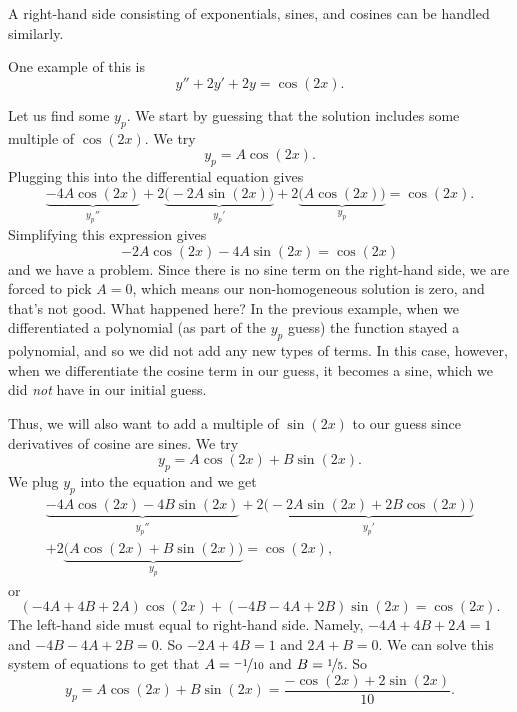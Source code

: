 \medskip

A right-hand side consisting of exponentials, sines, and cosines
can be handled similarly.  
\begin{example} One example of this is 
\begin{equation*}
y''+2y'+2y = \cos (2x) .
\end{equation*}
\end{example}
\begin{exampleSol}
Let us find some $y_p$.  We start by guessing that the solution
includes some multiple of $\cos(2x)$. We try
\begin{equation*}
y_p = A \cos(2x) .
\end{equation*}
Plugging this into the differential equation gives
\begin{equation*}
\underbrace{-4 A \cos (2x)}_{y_p''}
+2 \underbrace{\bigl(-2A \sin (2x)\bigr)}_{y_p'}
+
2 \underbrace{\bigl(A \cos (2x)\bigr)}_{y_p}
= \cos (2x).
\end{equation*}
Simplifying this expression gives
\begin{equation*}
-2A\cos(2x) - 4A\sin(2x) = \cos(2x)
\end{equation*}
and we have a problem. Since there is no sine term on the right-hand side, we are forced to pick $A = 0$, which means our non-homogeneous solution is zero, and that's not good. What happened here? In the previous example, when we differentiated a polynomial (as part of the $y_p$ guess) the function stayed a polynomial, and so we did not add any new types of terms. In this case, however, when we differentiate the cosine term in our guess, it becomes a sine, which we did \emph{not} have in our initial guess. 

Thus, we will also want to add a multiple of $\sin (2x)$ to our guess since derivatives of cosine are
sines.  We try
\begin{equation*}
y_p = A \cos (2x) + B \sin (2x) .
\end{equation*}
We plug $y_p$ into the equation and we get
\begin{multline*}
\underbrace{-4 A \cos (2x) - 4 B \sin (2x)}_{y_p''}
+2 \underbrace{\bigl(-2A \sin (2x) + 2B \cos (2x)\bigr)}_{y_p'}
\\
+
2 \underbrace{\bigl(A \cos (2x) + B \sin (2x)\bigr)}_{y_p}
= \cos (2x) ,
\end{multline*}
or
\begin{equation*}
(-4A+4B+2A) \cos(2x) +
(-4B-4A+2B) \sin(2x)
= \cos(2x) .
\end{equation*}
The left-hand side must equal to right-hand side.  Namely,
$-4A + 4B + 2A = 1$ and
$-4B - 4A + 2B = 0$.  So $-2A+4B =1$ and $2A+B=0$. We can solve this system of equations to get that $A=\nicefrac{-1}{10}$ and $B=\nicefrac{1}{5}$.  So
\begin{equation*}
y_p = A \cos (2x) + B \sin (2x) = \frac{-\cos (2x) + 2 \sin (2x)}{10} .
\end{equation*}
\end{exampleSol}

